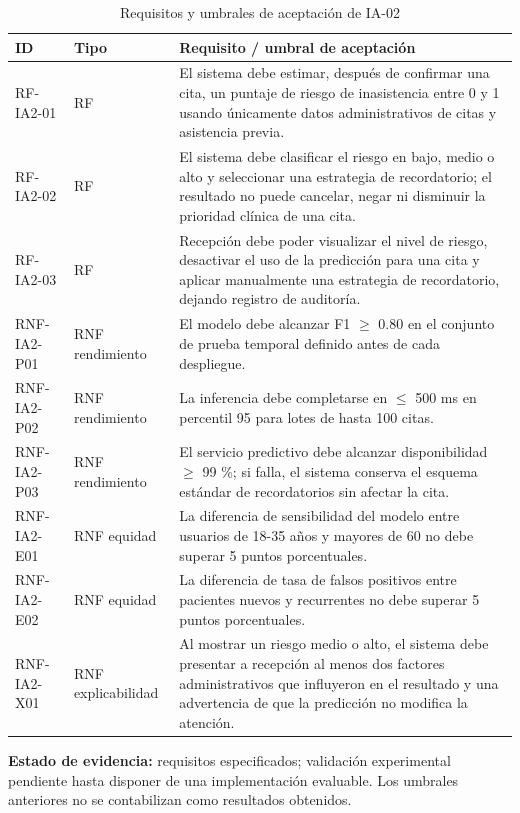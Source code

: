 \documentclass[11pt,a4paper]{article}
\begin{document}
	\begin{longtable}{p{2.5cm}p{3.4cm}p{9.8cm}}
		\caption{Requisitos y umbrales de aceptación de IA-02}\\\toprule\textbf{ID}&\textbf{Tipo}&\textbf{Requisito / umbral de aceptación}\\\midrule\endhead
		RF-IA2-01 & RF & El sistema debe estimar, después de confirmar una cita, un puntaje de riesgo de inasistencia entre 0 y 1 usando únicamente datos administrativos de citas y asistencia previa. \\
		RF-IA2-02 & RF & El sistema debe clasificar el riesgo en bajo, medio o alto y seleccionar una estrategia de recordatorio; el resultado no puede cancelar, negar ni disminuir la prioridad clínica de una cita. \\
		RF-IA2-03 & RF & Recepción debe poder visualizar el nivel de riesgo, desactivar el uso de la predicción para una cita y aplicar manualmente una estrategia de recordatorio, dejando registro de auditoría. \\
		RNF-IA2-P01 & RNF rendimiento & El modelo debe alcanzar F1 $\geq$ 0.80 en el conjunto de prueba temporal definido antes de cada despliegue. \\
		RNF-IA2-P02 & RNF rendimiento & La inferencia debe completarse en $\leq$ 500 ms en percentil 95 para lotes de hasta 100 citas. \\
		RNF-IA2-P03 & RNF rendimiento & El servicio predictivo debe alcanzar disponibilidad $\geq$ 99 \%; si falla, el sistema conserva el esquema estándar de recordatorios sin afectar la cita. \\
		RNF-IA2-E01 & RNF equidad & La diferencia de sensibilidad del modelo entre usuarios de 18-35 años y mayores de 60 no debe superar 5 puntos porcentuales. \\
		RNF-IA2-E02 & RNF equidad & La diferencia de tasa de falsos positivos entre pacientes nuevos y recurrentes no debe superar 5 puntos porcentuales. \\
		RNF-IA2-X01 & RNF explicabilidad & Al mostrar un riesgo medio o alto, el sistema debe presentar a recepción al menos dos factores administrativos que influyeron en el resultado y una advertencia de que la predicción no modifica la atención. \\
		\bottomrule\end{longtable}
	
	\textbf{Estado de evidencia:} requisitos especificados; validación experimental pendiente hasta disponer de una implementación evaluable. Los umbrales anteriores no se contabilizan como resultados obtenidos.
	
\end{document}
